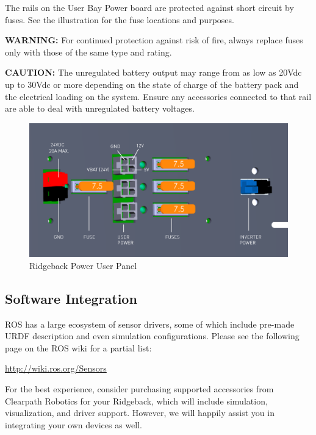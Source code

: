 \documentclass[]{clearpath-latex/clearpath-manual}
\begin{document}
The rails on the User Bay Power board are protected against short circuit by fuses. See the illustration for the fuse locations and purposes.

\textbf{WARNING:} For continued protection against risk of fire, always replace fuses only with those of the same type and rating.

\textbf{CAUTION:} The unregulated battery output may range from as low as 20Vdc up to 30Vdc or more depending on the state of charge of the battery pack and the electrical loading on the system. Ensure any accessories connected to that rail are able to deal with unregulated battery voltages.



\begin{figure}[h]
  \centering
  \includegraphics[width=1.0\linewidth]{Ridgeback_UserPower_SOLID.pdf}
  \caption{Ridgeback Power User Panel}
  \label{userpower}
\end{figure}





\subsection{Software Integration}

ROS has a large ecosystem of sensor drivers, some of which include pre-made URDF description and even simulation configurations.  Please see the following page on the ROS wiki for a partial list:

\url{http://wiki.ros.org/Sensors }

For the best experience, consider purchasing supported accessories from Clearpath Robotics for your Ridgeback, which will include simulation, visualization, and driver support.  However, we will happily assist you in integrating your own devices as well.
\end{document}
